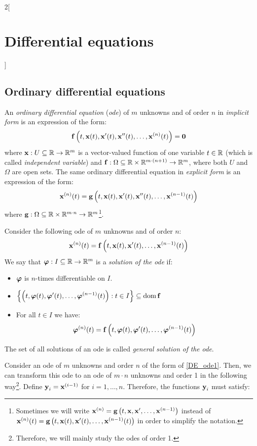 \documentclass[../../../main.tex]{subfiles}
\begin{document}
\begin{multicols}{2}[\section{Differential equations}]
  \subsection{Ordinary differential equations}
  \begin{definition}
    An \emph{ordinary differential equation} (\emph{ode}) of $m$ unknowns and of order $n$ in \emph{implicit form} is an expression of the form: $$\boldsymbol{\mathrm{f}}\left(t,\boldsymbol{\mathrm{x}}(t),\boldsymbol{\mathrm{x}}'(t),\boldsymbol{\mathrm{x}}''(t),\ldots,\boldsymbol{\mathrm{x}}^{(n)}(t)\right)=\boldsymbol{\mathrm{0}}$$
    where $\boldsymbol{\mathrm{x}}:U\subseteq\mathbb{R}\rightarrow\mathbb{R}^m$ is a vector-valued function of one variable $t\in\mathbb{R}$ (which is called \emph{independent variable}) and $\boldsymbol{\mathrm{f}}:\Omega\subseteq\mathbb{R}\times\mathbb{R}^{m\cdot(n+1)}\rightarrow\mathbb{R}^m$, where both $U$ and $\Omega$ are open sets. The same ordinary differential equation in \emph{explicit form} is an expression of the form: $$\boldsymbol{\mathrm{x}}^{(n)}(t)=\boldsymbol{\mathrm{g}}\left(t,\boldsymbol{\mathrm{x}}(t),\boldsymbol{\mathrm{x}}'(t),\boldsymbol{\mathrm{x}}''(t),\ldots,\boldsymbol{\mathrm{x}}^{(n-1)}(t)\right)$$
    where $\boldsymbol{\mathrm{g}}:\Omega\subseteq\mathbb{R}\times\mathbb{R}^{m\cdot n}\rightarrow\mathbb{R}^m$\footnote{Sometimes we will write $\boldsymbol{\mathrm{x}}^{(n)}=\boldsymbol{\mathrm{g}}\left(t,\boldsymbol{\mathrm{x}},\boldsymbol{\mathrm{x}}',\ldots,\boldsymbol{\mathrm{x}}^{(n-1)}\right)$ instead of $\boldsymbol{\mathrm{x}}^{(n)}(t)=\boldsymbol{\mathrm{g}}\left(t,\boldsymbol{\mathrm{x}}(t),\boldsymbol{\mathrm{x}}'(t),\ldots,\boldsymbol{\mathrm{x}}^{(n-1)}(t)\right)$ in order to simplify the notation.}.
  \end{definition}
  \begin{definition}
    Consider the following ode of $m$ unknowns and of order $n$:
    \begin{equation}\label{DE_ode1}
      \boldsymbol{\mathrm{x}}^{(n)}(t)=\boldsymbol{\mathrm{f}}\left(t,\boldsymbol{\mathrm{x}}(t),\boldsymbol{\mathrm{x}}'(t),\ldots,\boldsymbol{\mathrm{x}}^{(n-1)}(t)\right)
    \end{equation}
    We say that $\boldsymbol{\mathrm{\varphi}}:I\subseteq\mathbb{R}\rightarrow\mathbb{R}^m$ is a \emph{solution of the ode} if:
    \begin{itemize}
      \item $\boldsymbol{\mathrm{\varphi}}$ is $n$-times differentiable on $I$.
      \item $\displaystyle\left\{\left(t,\boldsymbol{\mathrm{\varphi}}(t),\boldsymbol{\mathrm{\varphi}}'(t),\ldots,\boldsymbol{\mathrm{\varphi}}^{(n-1)}(t)\right):t\in I\right\}\subseteq\operatorname{dom} \boldsymbol{\mathrm{f}}$
      \item For all $t\in I$ we have:
            $$\boldsymbol{\mathrm{\varphi}}^{(n)}(t)=\boldsymbol{\mathrm{f}}\left(t,\boldsymbol{\mathrm{\varphi}}(t),\boldsymbol{\mathrm{\varphi}}'(t),\ldots,\boldsymbol{\mathrm{\varphi}}^{(n-1)}(t)\right)$$
    \end{itemize}
    The set of all solutions of an ode is called \emph{general solution of the ode}.
  \end{definition}
  \begin{proposition}
    Consider an ode of $m$ unknowns and order $n$ of the form of \cref{DE_ode1}. Then, we can transform this ode to an ode of $m\cdot n$ unknowns and order 1 in the following way\footnote{Therefore, we will mainly study the odes of order 1.}. Define $\boldsymbol{\mathrm{y}}_i=\boldsymbol{\mathrm{x}}^{(i-1)}$ for $i=1,\ldots,n$. Therefore, the functions $\boldsymbol{\mathrm{y}}_i$ must satisfy:

\end{proposition}
\end{multicols}
\end{document}
